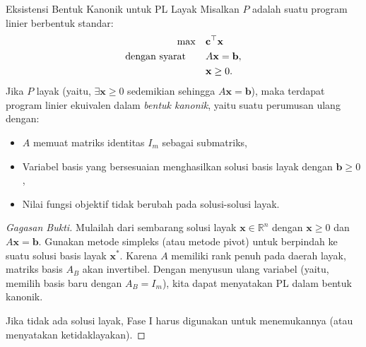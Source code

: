 \begin{proposition}{Eksistensi Bentuk Kanonik untuk PL Layak}\label{prop:canonical-exists}
Misalkan \( P \) adalah suatu program linier berbentuk standar:
\[
\begin{aligned}
\max \quad & \mathbf{c}^\top \mathbf{x} \\
\mbox{dengan syarat}\quad \quad & A\mathbf{x} = \mathbf{b}, \\
& \mathbf{x} \geq 0.
\end{aligned}
\]
Jika \( P \) layak (yaitu, \( \exists \mathbf{x} \geq 0 \) sedemikian sehingga \( A\mathbf{x} = \mathbf{b} \)), maka terdapat program linier ekuivalen dalam \emph{bentuk kanonik}, yaitu suatu perumusan ulang dengan:
\begin{itemize}
    \item \( A \) memuat matriks identitas \( I_m \) sebagai submatriks,
    \item Variabel basis yang bersesuaian menghasilkan solusi basis layak dengan \( \mathbf{b} \geq 0 \),
    \item Nilai fungsi objektif tidak berubah pada solusi-solusi layak.
\end{itemize}
\end{proposition}

\begin{proof}[Gagasan Bukti]
Mulailah dari sembarang solusi layak \( \mathbf{x} \in \mathbb{R}^n \) dengan \( \mathbf{x} \geq 0 \) dan \( A\mathbf{x} = \mathbf{b} \).  
Gunakan metode simpleks (atau metode pivot) untuk berpindah ke suatu solusi basis layak \( \mathbf{x}^* \).  
Karena \( A \) memiliki rank penuh pada daerah layak, matriks basis \( A_B \) akan invertibel.  
Dengan menyusun ulang variabel (yaitu, memilih basis baru dengan \( A_B = I_m \)), kita dapat menyatakan PL dalam bentuk kanonik.

Jika tidak ada solusi layak, Fase I harus digunakan untuk menemukannya (atau menyatakan ketidaklayakan).
\end{proof}


